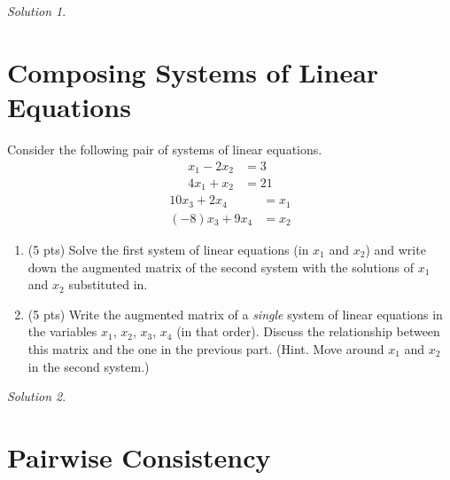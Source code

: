 \documentclass{article}
\theoremstyle{remark}
\newtheorem*{solution}{Solution}
\begin{document}
\begin{solution}
\end{solution}

\pagebreak
\section{Composing Systems of Linear Equations}

Consider the following pair of systems of linear equations.
\begin{align*}
  x_1 - 2x_2 &= 3 \\
  4x_1 + x_2 &= 21
\end{align*}
\begin{align*}
  10x_3 + 2x_4 &= x_1 \\
  (-8)x_3 + 9x_4 &= x_2
\end{align*}
\begin{enumerate}
\item (5 pts) Solve the first system of linear equations (in $x_1$ and $x_2$) and write down the augmented matrix of the second system with the solutions of $x_1$ and $x_2$ substituted in.
\item (5 pts) Write the augmented matrix of a \textit{single} system of linear equations in the variables $x_1$, $x_2$, $x_3$, $x_4$ (in that order). Discuss the relationship between this matrix and the one in the previous part. (Hint. Move around $x_1$ and $x_2$ in the second system.)
\end{enumerate}

\begin{solution}
\end{solution}

\pagebreak
\section{Pairwise Consistency}
\end{document}
